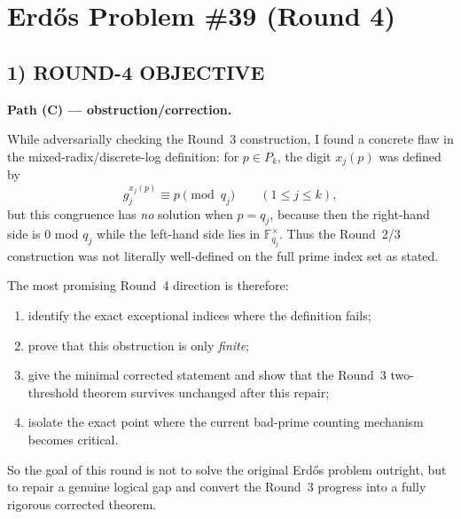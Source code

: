 \section{Erd\H{o}s Problem \#39 (Round 4)}

\subsection*{1) ROUND-4 OBJECTIVE}
\textbf{Path (C) --- obstruction/correction.}

While adversarially checking the Round~3 construction, I found a concrete flaw in the mixed-radix/discrete-log definition: for $p\in P_k$, the digit $x_j(p)$ was defined by
\[
g_j^{x_j(p)}\equiv p \pmod{q_j}\qquad (1\le j\le k),
\]
but this congruence has \emph{no} solution when $p=q_j$, because then the right-hand side is $0$ mod $q_j$ while the left-hand side lies in $\mathbb F_{q_j}^{\times}$.
Thus the Round~2/3 construction was not literally well-defined on the full prime index set as stated.

The most promising Round~4 direction is therefore:
\begin{enumerate}
\item identify the exact exceptional indices where the definition fails;
\item prove that this obstruction is only \emph{finite};
\item give the minimal corrected statement and show that the Round~3 two-threshold theorem survives unchanged after this repair;
\item isolate the exact point where the current bad-prime counting mechanism becomes critical.
\end{enumerate}

So the goal of this round is not to solve the original Erd\H{o}s problem outright, but to repair a genuine logical gap and convert the Round~3 progress into a fully rigorous corrected theorem.

